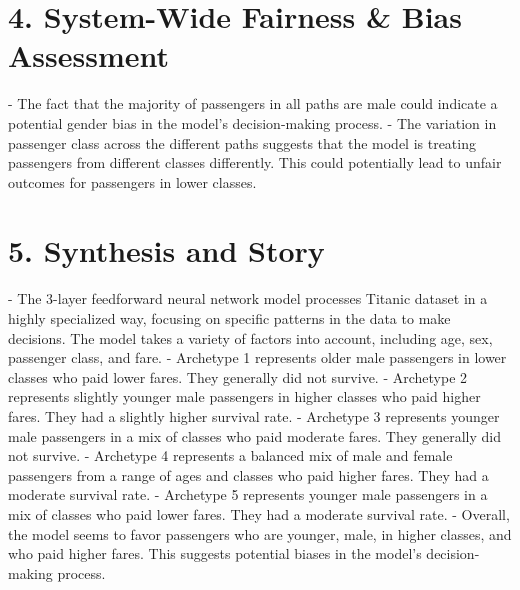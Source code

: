 \section*{4. System-Wide Fairness \& Bias Assessment}
- The fact that the majority of passengers in all paths are male could indicate a potential gender bias in the model's decision-making process.
- The variation in passenger class across the different paths suggests that the model is treating passengers from different classes differently. This could potentially lead to unfair outcomes for passengers in lower classes.

\section*{5. Synthesis and Story}
- The 3-layer feedforward neural network model processes Titanic dataset in a highly specialized way, focusing on specific patterns in the data to make decisions. The model takes a variety of factors into account, including age, sex, passenger class, and fare.
- Archetype 1 represents older male passengers in lower classes who paid lower fares. They generally did not survive.
- Archetype 2 represents slightly younger male passengers in higher classes who paid higher fares. They had a slightly higher survival rate.
- Archetype 3 represents younger male passengers in a mix of classes who paid moderate fares. They generally did not survive.
- Archetype 4 represents a balanced mix of male and female passengers from a range of ages and classes who paid higher fares. They had a moderate survival rate.
- Archetype 5 represents younger male passengers in a mix of classes who paid lower fares. They had a moderate survival rate.
- Overall, the model seems to favor passengers who are younger, male, in higher classes, and who paid higher fares. This suggests potential biases in the model's decision-making process.